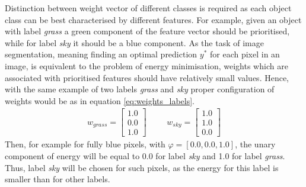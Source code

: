 Distinction between weight vector of different classes is required as each object class can be best characterised by different features. For example, given an object with label \textit{grass} a green component of the feature vector should be prioritised, while for label \textit{sky} it should be a blue component. As the task of image segmentation, meaning finding an optimal prediction $y^*$ for each pixel in an image, is equivalent to the problem of energy minimisation, weights which are associated with prioritised features should have relatively small values. Hence, with the same example of two labels \textit{grass} and \textit{sky} proper configuration of weights would be as in equation \ref{eq:weights_labels}.
\begin{equation}
    \label{eq:weights_labels}
    \begin{matrix} 
        w_{grass} = \begin{bmatrix}
            1.0\\ 
            0.0\\ 
            1.0
            \end{bmatrix}  
        & & &
        w_{sky} = \begin{bmatrix}
            1.0\\ 
            1.0\\ 
            0.0
            \end{bmatrix} 
    \end{matrix}
\end{equation}
Then, for example for fully blue pixels, with $\varphi = [0.0, 0.0, 1.0]$, the unary component of energy will be equal to 0.0 for label \textit{sky} and 1.0 for label \textit{grass}. Thus, label \textit{sky} will be chosen for such pixels, as the energy for this label is smaller than for other labels. 


